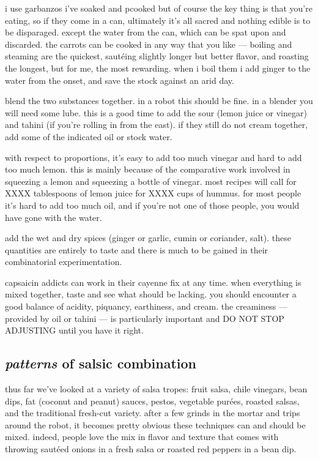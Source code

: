 i use garbanzos i've soaked and pcooked but of course the key thing is
that you're eating, so if they come in a can, ultimately it's all
sacred and nothing edible is to be disparaged. except the water from
the can, which can be spat upon and discarded. the carrots can be
cooked in any way that you like --- boiling and steaming are the
quickest, saut\'{e}ing slightly longer but better flavor, and roasting
the longest, but for me, the most rewarding. when i boil them i add
ginger to the water from the onset, and save the stock against an arid
day.

blend the two substances together. in a robot this should be fine. in
a blender you will need some lube. this is a good time to add the sour
(lemon juice or vinegar) and tahini (if you're rolling in from the
east). if they still do not cream together, add some of the indicated
oil or stock water.

with respect to proportions, it's easy to add too much vinegar and
hard to add too much lemon. this is mainly because of the comparative
work involved in squeezing a lemon and squeezing a bottle of
vinegar. most recipes will call for XXXX tablespoons of lemon juice
for XXXX cups of hummus. for most people it's hard to add too much
oil, and if you're not one of those people, you would have gone with
the water.

add the wet and dry spices (ginger or garlic, cumin or coriander,
salt). these quantities are entirely to taste and there is much to be
gained in their combinatorial experimentation.

capsaicin addicts can work in their cayenne fix at any time. when
everything is mixed together, taste and see what should be
lacking. you should encounter a good balance of acidity, piquancy,
earthiness, and cream. the creaminess --- provided by oil or tahini
--- is particularly important and DO NOT STOP ADJUSTING until you have
it right.

\subsection{\textit{patterns} of salsic combination}

thus far we've looked at a variety of salsa tropes: fruit salsa, chile
vinegars, bean dips, fat (coconut and peanut) sauces, pestos,
vegetable pur\'{e}es, roasted salsas, and the traditional fresh-cut
variety. after a few grinds in the mortar and trips around the robot,
it becomes pretty obvious these techniques can and should be
mixed. indeed, people love the mix in flavor and texture that comes
with throwing saut\'{e}ed onions in a fresh salsa or roasted red
peppers in a bean dip.

